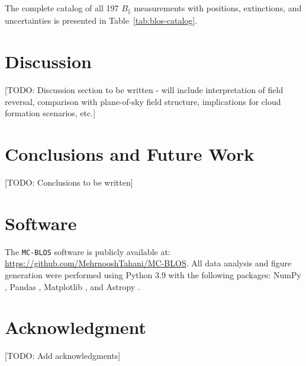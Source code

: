 \documentclass[twocolumn]{aastex631}
\begin{document}
The complete catalog of all 197 $B_\parallel$ measurements with positions, extinctions, and uncertainties is presented in Table~\ref{tab:blos-catalog}.



\section{Discussion}
\label{sec:discussion}

[TODO: Discussion section to be written - will include interpretation of field reversal, comparison with plane-of-sky field structure, implications for cloud formation scenarios, etc.]

\section{Conclusions and Future Work}
\label{sec:conclusions}

[TODO: Conclusions to be written]

\section{Software}
The \texttt{MC-BLOS} software is publicly available at: \url{https://github.com/MehrnooshTahani/MC-BLOS}. All data analysis and figure generation were performed using Python 3.9 with the following packages: NumPy \citep{harris2020array}, Pandas \citep{mckinney2010data}, Matplotlib \citep{hunter2007matplotlib}, and Astropy \citep{astropy2013, astropy2018}.

\section{Acknowledgment}

[TODO: Add acknowledgments]




\end{document}

